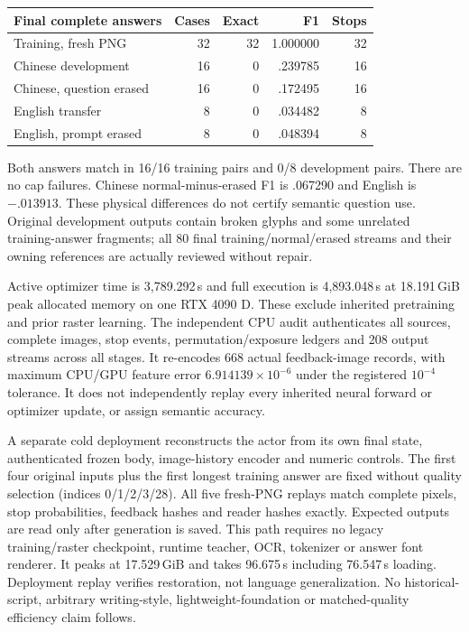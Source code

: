 \begin{center}\begin{tabular}{lrrrr}
Final complete answers & Cases & Exact & F1 & Stops\\\hline
Training, fresh PNG & 32 & 32 & 1.000000 & 32\\
Chinese development & 16 & 0 & .239785 & 16\\
Chinese, question erased & 16 & 0 & .172495 & 16\\
English transfer & 8 & 0 & .034482 & 8\\
English, prompt erased & 8 & 0 & .048394 & 8\\
\end{tabular}\end{center}
Both answers match in 16/16 training pairs and 0/8 development pairs. There
are no cap failures. Chinese normal-minus-erased F1 is .067290 and English
is $-.013913$. These physical differences do not certify semantic question
use. Original development outputs contain broken glyphs and some unrelated
training-answer fragments; all 80 final training/normal/erased streams and
their owning references are actually reviewed without repair.

Active optimizer time is 3,789.292\,s and full execution is 4,893.048\,s at
18.191\,GiB peak allocated memory on one RTX 4090 D. These exclude inherited
pretraining and prior raster learning. The independent CPU audit authenticates
all sources, complete images, stop events, permutation/exposure ledgers and
208 output streams across all stages. It re-encodes 668 actual feedback-image
records, with maximum CPU/GPU feature error $6.914139\times10^{-6}$ under
the registered $10^{-4}$ tolerance. It does not independently replay every
inherited neural forward or optimizer update, or assign semantic accuracy.

A separate cold deployment reconstructs the actor from its own final state,
authenticated frozen body, image-history encoder and numeric controls. The
first four original inputs plus the first longest training answer are fixed
without quality selection (indices 0/1/2/3/28). All five fresh-PNG replays
match complete pixels, stop probabilities, feedback hashes and reader hashes
exactly. Expected outputs are read only after generation is saved. This path
requires no legacy training/raster checkpoint, runtime teacher, OCR,
tokenizer or answer font renderer. It peaks at 17.529\,GiB and takes
96.675\,s including 76.547\,s loading. Deployment replay verifies restoration,
not language generalization. No historical-script, arbitrary writing-style,
lightweight-foundation or matched-quality efficiency claim follows.

